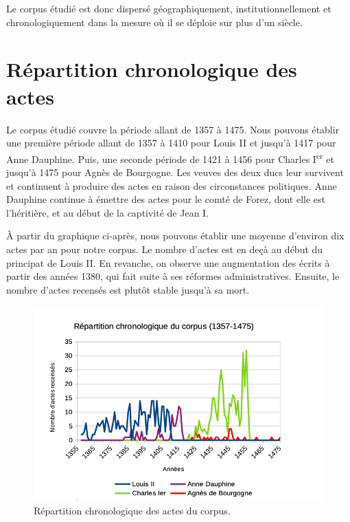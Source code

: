 \par Le corpus étudié est donc dispersé géographiquement, institutionnellement et chronologiquement dans la mesure où il se déploie sur plus d'un siècle. 

\section{Répartition chronologique des actes}
\label{I.1.2}

\par Le corpus étudié couvre la période allant de 1357 à 1475. Nous pouvons établir une première période allant de 1357 à 1410 pour Louis II et jusqu'à 1417 pour Anne Dauphine. Puis, une seconde période de 1421 à 1456 pour Charles I\textsuperscript{er} et jusqu'à 1475 pour Agnès de Bourgogne. Les veuves des deux ducs leur survivent et continuent à produire des actes en raison des circonstances politiques. Anne Dauphine continue à émettre des actes pour le comté de Forez, dont elle est l'héritière, et au début de la captivité de Jean I.
\newline 

\par À partir du graphique ci-après, nous pouvons établir une moyenne d'environ dix actes par an pour notre corpus. Le nombre d'actes est en deçà au début du principat de Louis II. En revanche, on observe une augmentation des écrits à partir des années 1380, qui fait suite à ses réformes administratives. Ensuite, le nombre d'actes recensés est plutôt stable jusqu'à sa mort. 

\begin{figure}[ht]
\centering
\includegraphics[scale=0.6]{front/images/repartition_chronologique_corpus.png}\caption{Répartition chronologique des actes du corpus.} \label{fig:chrono_actes}
\end{figure}
\newpage 

